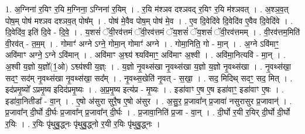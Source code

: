 \documentclass[17pt]{extarticle}
\begin{document}
1. अ॒ग्निना॑ र॒यिꣳ र॒यि म॒ग्निना॒ ऽग्निना॑ र॒यिम् । . र॒यि म॑श्ञव दश्ञवद् र॒यिꣳ र॒यि म॑श्ञवत् । . अ॒श्ञ॒व॒त् पोष॒म् पोष॑ मश्ञव दश्ञव॒त् पोष᳚म् । . पोष॑ मे॒वैव पोष॒म् पोष॑ मे॒व । . ए॒व दि॒वेदि॑वे दि॒वेदि॑व ए॒वैव दि॒वेदि॑वे । . दि॒वेदि॑व॒ इति॑ दि॒वे - दि॒वे॒ । . य॒शसं॑ ॅवी॒रव॑त्तमं ॅवी॒रव॑त्तमं ॅय॒शसं॑ ॅय॒शसं॑ ॅवी॒रव॑त्तमम् । . वी॒रव॑त्तम॒मिति॑ वी॒रव॑त् - त॒म॒म् । . गोमाꣳ॑ अग्ने ऽग्ने॒ गोमा॒न् गोमाꣳ॑ अग्ने । . गोमा॒निति॒ गो - मा॒न् । . अ॒ग्ने ऽवि॑माꣳ॒॒ अवि॑माꣳ अग्ने॒ ऽग्ने ऽवि॑मान् । . अवि॑माꣳ अ॒श्व्य॑ श्व्यवि॑माꣳ॒॒ अवि॑माꣳ अ॒श्वी । . अवि॑मा॒नित्यवि॑ - मा॒न् । . अ॒श्वी य॒ज्ञो य॒ज्ञो᳚(1॒ओ) ऽश्व्य॑श्वी य॒ज्ञ्ः । . य॒ज्ञो नृ॒वथ्स॑खा नृ॒वथ्स॑खा य॒ज्ञो य॒ज्ञो नृ॒वथ्स॑खा । . नृ॒वथ्स॑खा॒ सदꣳ॒॒ सद॑म् नृ॒वथ्स॑खा नृ॒वथ्स॑खा॒ सद᳚म् । . नृ॒वथ्स॒खेति॑ नृ॒वत् - स॒खा॒ । . सद॒ मिदिथ् सदꣳ॒॒ सद॒ मित् । . इद॑प्रमृ॒ष्यो᳚ ऽप्रमृ॒ष्य इदिद॑प्रमृ॒ष्यः । . अ॒प्र॒मृ॒ष्य इत्य॑प्र - मृ॒ष्यः । . इडा॑वाꣳ ए॒ष ए॒ष इडा॑वाꣳ॒॒ इडा॑वाꣳ ए॒षः । . इडा॑वा॒नितीडा᳚ - वा॒न् । . ए॒षो अ॑सुरा सुरै॒ष ए॒षो अ॑सुर । . अ॒सु॒र॒ प्र॒जावा᳚न् प्र॒जावा॑ नसुरासुर प्र॒जावान्॑ । . प्र॒जावा᳚न् दी॒र्घो दी॒र्घः प्र॒जावा᳚न् प्र॒जावा᳚न् दी॒र्घः । . प्र॒जावा॒निति॑ प्र॒जा - वा॒न् । . दी॒र्घो र॒यी र॒यिर् दी॒र्घो दी॒र्घो र॒यिः । . र॒यिः पृ॑थुबु॒द्ध्नः पृ॑थुबु॒द्ध्नो र॒यी र॒यिः पृ॑थुबु॒द्ध्नः । \newline
\end{document}
